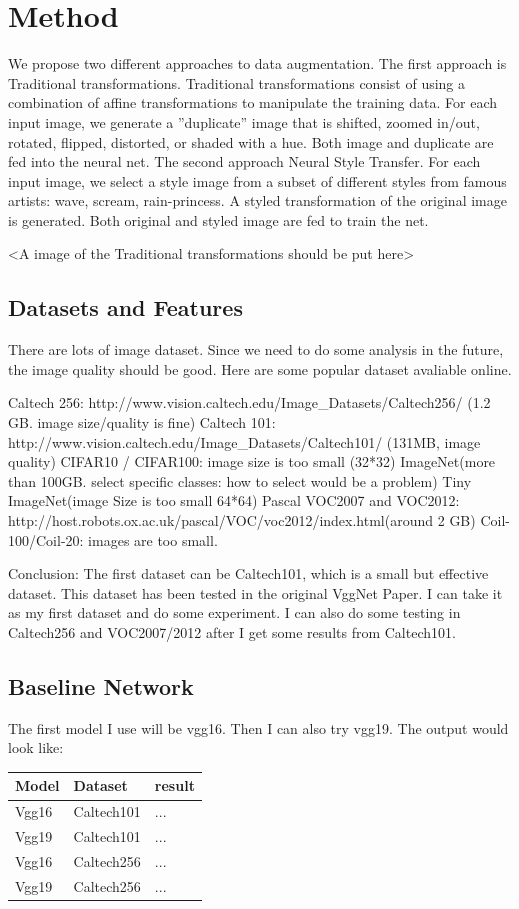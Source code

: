 \documentclass[a4paper,11pt]{article}
\begin{document}
\section{Method}
We propose two different approaches to data augmentation. The first approach is Traditional transformations. Traditional transformations consist of using a combination of affine transformations to manipulate the training data. For each input image, we generate a ”duplicate” image that is shifted, zoomed in/out, rotated, flipped, distorted, or shaded with a hue. Both image and duplicate are fed into the neural net. The second approach Neural Style Transfer. For each input image, we select a style image from a subset of different styles from famous artists: wave, scream, rain-princess. A styled transformation of the original image is generated. Both original and styled image are fed to train the net.

<A image of the Traditional transformations should be put here>


\subsection{Datasets and Features}
There are lots of image dataset. Since we need to do some analysis in the future, the image quality should be good. Here are some popular dataset avaliable online.
\begin{outline}
\1 Caltech 256: http://www.vision.caltech.edu/Image\_Datasets/Caltech256/ (1.2 GB. image size/quality is fine)
\1 Caltech 101: http://www.vision.caltech.edu/Image\_Datasets/Caltech101/ (131MB, image quality)
\1 CIFAR10 / CIFAR100: image size is too small (32*32)
\1 ImageNet(more than 100GB. select specific classes: how to select would be a problem)
\1 Tiny ImageNet(image Size is too small 64*64)
\1 Pascal VOC2007 and VOC2012: http://host.robots.ox.ac.uk/pascal/VOC/voc2012/index.html(around 2 GB)
\1 Coil-100/Coil-20: images are too small.
\end{outline}
Conclusion: The first dataset can be Caltech101, which is a small but effective dataset. This dataset has been tested in the original VggNet Paper. I can take it as my first dataset and do some experiment. I can also do some testing in Caltech256 and VOC2007/2012 after I get some results from Caltech101.

\subsection{Baseline Network}
The first model I use will be vgg16. Then I can also try vgg19. The output would look like:
\begin{center}
    \begin{tabular}{| l | l | l |}
    \hline
    \textbf{Model} & \textbf{Dataset} & \textbf{result} \\ \hline
    Vgg16 & Caltech101 & ... \\ \hline
    Vgg19 & Caltech101 & ... \\ \hline
    Vgg16 & Caltech256 & ... \\ \hline
    Vgg19 & Caltech256 & ... \\ \hline
    \end{tabular}
\end{center}
\end{document}
